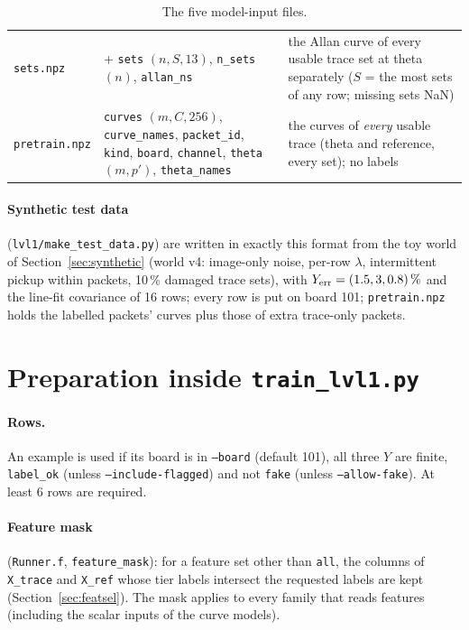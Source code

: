 \documentclass[10pt]{article}
\newcommand{\code}[1]{\texttt{#1}}
\begin{document}
\begin{table}[H]
\begin{tabularx}{\textwidth}{>{\raggedright\arraybackslash}p{2.4cm}>{\raggedright\arraybackslash}p{4.6cm}L}
\code{sets.npz} & + \code{sets} $(n,S,13)$, \code{n\_sets} $(n)$, \code{allan\_ns} & the Allan curve of every usable
trace set at theta separately ($S$ = the most sets of any row; missing sets NaN) \\
\code{pretrain.npz} & \code{curves} $(m,C,256)$, \code{curve\_names}, \code{packet\_id}, \code{kind}, \code{board},
\code{channel}, \code{theta} $(m,p')$, \code{theta\_names} & the curves of \emph{every} usable trace (theta and reference,
every set); no labels \\
\bottomrule
\end{tabularx}
\caption{The five model-input files.}
\label{tab:files}
\end{table}

\paragraph{Synthetic test data} (\code{lvl1/make\_test\_data.py}) are written in exactly this format from the toy world
of Section~\ref{sec:synthetic} (world v4: image-only noise, per-row $\lambda$, intermittent pickup within packets, 10\,\%
damaged trace sets), with $Y_{\rm err} = (1.5, 3, 0.8)\,\%$ and the line-fit covariance of 16 rows; every row is put on
board 101; \code{pretrain.npz} holds the labelled packets' curves plus those of extra trace-only packets.

\section{Preparation inside \code{train\_lvl1.py}}
\label{sec:prep}

\paragraph{Rows.} An example is used if its board is in \code{--board} (default 101), all three $Y$ are finite,
\code{label\_ok} (unless \code{--include-flagged}) and not \code{fake} (unless \code{--allow-fake}). At least 6 rows are
required.

\paragraph{Feature mask} (\code{Runner.f}, \code{feature\_mask}): for a feature set other than \code{all}, the columns of
\code{X\_trace} and \code{X\_ref} whose tier labels intersect the requested labels are kept (Section~\ref{sec:featsel}).
The mask applies to every family that reads features (including the scalar inputs of the curve models).
\end{document}
